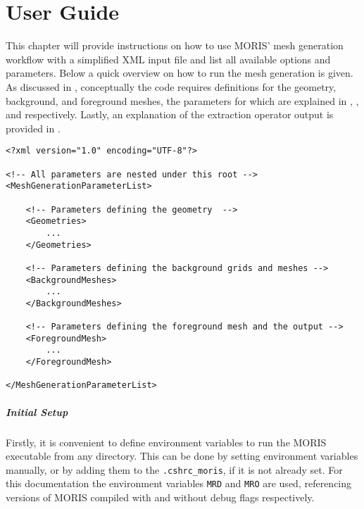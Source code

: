 \chapter{User Guide}
\label{sec:tutorial}

This chapter will provide instructions on how to use MORIS' mesh generation workflow with a simplified XML input file and list all available options and parameters.
Below a quick overview on how to run the mesh generation is given. As discussed in , conceptually the code requires definitions for the geometry, background, and foreground meshes, the parameters for which are explained in , , and  respectively. Lastly, an explanation of the extraction operator output is provided in .

\begin{minipage}{\linewidth}
\vspace{0.5cm}
\begin{lstlisting}[caption={Structure of the XML input file},captionpos=b, label={lst:input_structure}]
<?xml version="1.0" encoding="UTF-8"?>

<!-- All parameters are nested under this root -->
<MeshGenerationParameterList>

    <!-- Parameters defining the geometry  -->
    <Geometries>
        ...
    </Geometries>
    
    <!-- Parameters defining the background grids and meshes -->
    <BackgroundMeshes>
        ...
    </BackgroundMeshes>
    
    <!-- Parameters defining the foreground mesh and the output -->
    <ForegroundMesh>
        ...
    </ForegroundMesh>

</MeshGenerationParameterList>
\end{lstlisting}
\end{minipage}

\paragraph{Initial Setup} Firstly, it is convenient to define environment variables to run the MORIS executable from any directory. This can be done by setting environment variables manually, or by adding them to the \texttt{.cshrc\_moris}, if it is not already set. For this documentation the environment variables \texttt{MRD} and \texttt{MRO} are used, referencing versions of MORIS compiled with and without debug flags respectively.  


